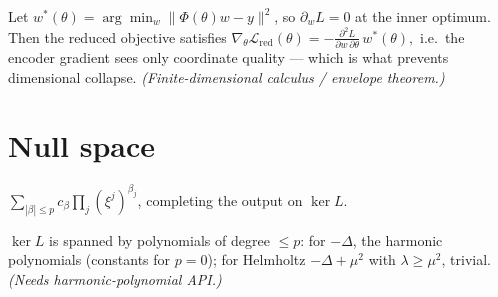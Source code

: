 \begin{theorem}\label{thm:varpro}
  Let $w^\ast(\theta)=\arg\min_w\|\Phi(\theta)w-y\|^2$, so $\partial_w L=0$ at the inner
  optimum. Then the reduced objective satisfies
  $\displaystyle \nabla_\theta\mathcal L_{\mathrm{red}}(\theta)
     =-\frac{\partial^2 L}{\partial w\,\partial\theta}\,w^\ast(\theta),$
  i.e.\ the encoder gradient sees only coordinate quality — which is what prevents
  dimensional collapse. \emph{(Finite-dimensional calculus / envelope theorem.)}
\end{theorem}

\section{Null space}

\begin{definition}\label{def:nullspace}
  $\sum_{|\beta|\le p} c_\beta\prod_j(\xi^j)^{\beta_j}$, completing the output on $\ker L$.
\end{definition}

\begin{theorem}\label{thm:nullspace}
  $\ker L$ is spanned by polynomials of degree $\le p$: for $-\Delta$, the harmonic
  polynomials (constants for $p=0$); for Helmholtz $-\Delta+\mu^2$ with $\lambda\ge\mu^2$,
  trivial. \emph{(Needs harmonic-polynomial API.)}
\end{theorem}
